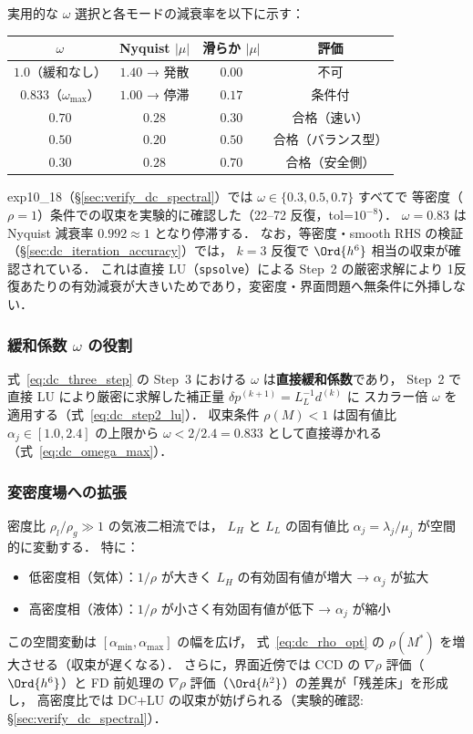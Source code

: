 実用的な $\omega$ 選択と各モードの減衰率を以下に示す：

\begin{center}
\PaperTableSetup
\begin{tabular}{cccc}
\toprule
$\omega$ & Nyquist $|\mu|$ & 滑らか $|\mu|$ & 評価 \\
\midrule
$1.0$（緩和なし） & $1.40$ → 発散 & $0.00$ & 不可 \\
$0.833$（$\omega_{\max}$） & $1.00$ → 停滞 & $0.17$ & 条件付 \\
$0.70$ & $0.28$ & $0.30$ & 合格（速い） \\
$\mathbf{0.50}$ & $\mathbf{0.20}$ & $\mathbf{0.50}$ & 合格（バランス型） \\
$0.30$ & $0.28$ & $0.70$ & 合格（安全側） \\
\bottomrule
\end{tabular}
\end{center}

exp10\_18（§\ref{sec:verify_dc_spectral}）では $\omega \in \{0.3, 0.5, 0.7\}$ すべてで
等密度（$\rho=1$）条件での収束を実験的に確認した（22--72 反復，tol=$10^{-8}$）．
$\omega = 0.83$ は Nyquist 減衰率 $0.992 \approx 1$ となり停滞する．
なお，等密度・smooth RHS の検証（§\ref{sec:dc_iteration_accuracy}）では，
$k = 3$ 反復で $\Ord{h^6}$ 相当の収束が確認されている．
これは直接 LU（\texttt{spsolve}）による Step~2 の厳密求解により
1反復あたりの有効減衰が大きいためであり，変密度・界面問題へ無条件に外挿しない．

\subsubsection*{緩和係数 $\omega$ の役割}

式~\eqref{eq:dc_three_step} の Step~3 における $\omega$ は\textbf{直接緩和係数}であり，
Step~2 で直接 LU により厳密に求解した補正量 $\delta p^{(k+1)} = L_L^{-1} d^{(k)}$ に
スカラー倍 $\omega$ を適用する（式~\eqref{eq:dc_step2_lu}）．
収束条件 $\rho(M) < 1$ は固有値比 $\alpha_j \in [1.0, 2.4]$ の上限から
$\omega < 2/2.4 = 0.833$ として直接導かれる（式~\eqref{eq:dc_omega_max}）．

\subsubsection*{変密度場への拡張}

密度比 $\rho_l/\rho_g \gg 1$ の気液二相流では，
$L_H$ と $L_L$ の固有値比 $\alpha_j = \lambda_j/\mu_j$ が空間的に変動する．
特に：
\begin{itemize}
  \item 低密度相（気体）：$1/\rho$ が大きく $L_H$ の有効固有値が増大 → $\alpha_j$ が拡大
  \item 高密度相（液体）：$1/\rho$ が小さく有効固有値が低下 → $\alpha_j$ が縮小
\end{itemize}
この空間変動は $[\alpha_{\min}, \alpha_{\max}]$ の幅を広げ，
式~\eqref{eq:dc_rho_opt} の $\rho(M^*)$ を増大させる（収束が遅くなる）．
さらに，界面近傍では CCD の $\nabla\rho$ 評価（$\Ord{h^6}$）と
FD 前処理の $\nabla\rho$ 評価（$\Ord{h^2}$）の差異が「残差床」を形成し，
高密度比では DC+LU の収束が妨げられる（実験的確認: §\ref{sec:verify_dc_spectral}）．


